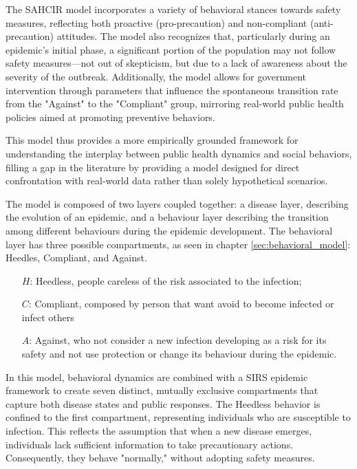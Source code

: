 The SAHCIR  model incorporates a variety of behavioral stances towards safety measures, reflecting both proactive (pro-precaution) and non-compliant (anti-precaution) attitudes. The model also recognizes that, particularly during an epidemic's initial phase, a significant portion of the population may not follow safety measures—not out of skepticism, but due to a lack of awareness about the severity of the outbreak. Additionally, the model allows for government intervention through parameters that influence the spontaneous transition rate from the "Against" to the "Compliant" group, mirroring real-world public health policies aimed at promoting preventive behaviors. 

This model thus provides a more empirically grounded framework for understanding the interplay between public health dynamics and social behaviors, filling a gap in the literature by providing a model designed for direct confrontation with real-world data rather than solely hypothetical scenarios.


The model is composed of two layers coupled together: a disease layer, describing the evolution of an epidemic, and a behaviour layer describing the transition among different behaviours during the epidemic development.
The behavioral layer has three possible compartments, as seen in chapter \ref{sec:behavioral_model}: Heedles, Compliant, and Against.

\begin{itemize}
	\item[$H$:] Heedless, people careless of the risk associated to the infection;
	\item[$C$:] Compliant, composed by person that want avoid to become infected or infect others
	\item[$A$:] Against, who not consider a new infection developing as a risk for its safety and not use protection or change its behaviour during the epidemic. 
\end{itemize}

In this model, behavioral dynamics are combined with a SIRS epidemic framework to create seven distinct, mutually exclusive compartments that capture both disease states and public responses. The Heedless behavior is confined to the first compartment, representing individuals who are susceptible to infection. This reflects the assumption that when a new disease emerges, individuals lack sufficient information to take precautionary actions. Consequently, they behave "normally," without adopting safety measures.

